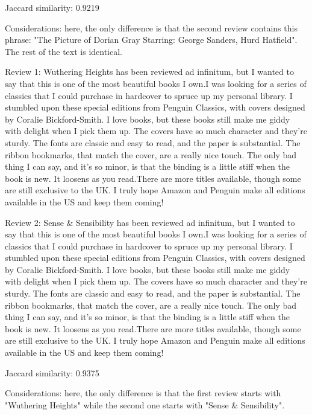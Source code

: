 \documentclass[12pt, a4paper[]{article}
\begin{document}
\begin{itemize}
{    \item Jaccard similarity: 0.9219
    \item Considerations: here, the only difference is that the second review contains this phrase: "The Picture of Dorian Gray Starring: George Sanders, Hurd Hatfield". The rest of the text is identical.
    }
\end{itemize}
\dotfill
\begin{itemize}
    {\fontsize{9pt}{11pt}\selectfont
    \item Review 1: Wuthering Heights has been reviewed ad infinitum, but I wanted to say that this is one of the most beautiful books I own.I was looking for a series of classics that I could purchase in hardcover to spruce up my personal library. I stumbled upon these special editions from Penguin Classics, with covers designed by Coralie Bickford-Smith. I love books, but these books still make me giddy with delight when I pick them up. The covers have so much character and they're sturdy. The fonts are classic and easy to read, and the paper is substantial. The ribbon bookmarks, that match the cover, are a really nice touch. The only bad thing I can say, and it's so minor, is that the binding is a little stiff when the book is new. It loosens as you read.There are more titles available, though some are still exclusive to the UK. I truly hope Amazon and Penguin make all editions available in the US and keep them coming!
    \item Review 2: Sense & Sensibility has been reviewed ad infinitum, but I wanted to say that this is one of the most beautiful books I own.I was looking for a series of classics that I could purchase in hardcover to spruce up my personal library. I stumbled upon these special editions from Penguin Classics, with covers designed by Coralie Bickford-Smith. I love books, but these books still make me giddy with delight when I pick them up. The covers have so much character and they're sturdy. The fonts are classic and easy to read, and the paper is substantial. The ribbon bookmarks, that match the cover, are a really nice touch. The only bad thing I can say, and it's so minor, is that the binding is a little stiff when the book is new. It loosens as you read.There are more titles available, though some are still exclusive to the UK. I truly hope Amazon and Penguin make all editions available in the US and keep them coming!
    \item Jaccard similarity: 0.9375
    \item Considerations: here, the only difference is that the first review starts with "Wuthering Heights" while the second one starts with "Sense & Sensibility".
    }
\end{itemize}
\end{document}
